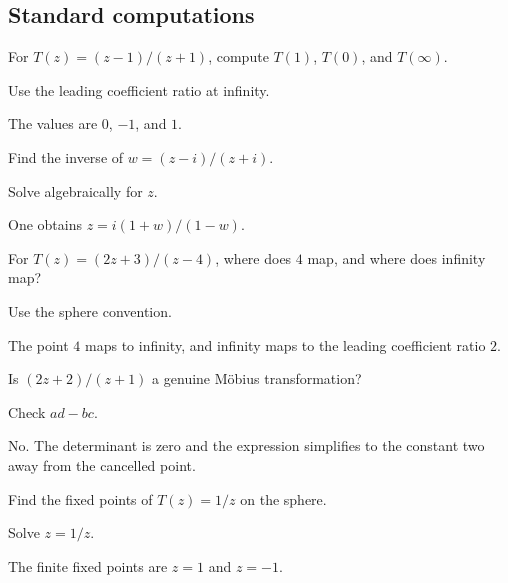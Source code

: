 \subsection*{Standard computations}

\begin{exercise}\label{exr:iv16-expand-01}
For \(T(z)=(z-1)/(z+1)\), compute \(T(1)\), \(T(0)\), and \(T(\infty)\).
\end{exercise}
\begin{hint}
Use the leading coefficient ratio at infinity.
\end{hint}
\begin{solution}
The values are \(0\), \(-1\), and \(1\).
\end{solution}

\begin{exercise}\label{exr:iv16-expand-02}
Find the inverse of \(w=(z-i)/(z+i)\).
\end{exercise}
\begin{hint}
Solve algebraically for \(z\).
\end{hint}
\begin{solution}
One obtains \(z=i(1+w)/(1-w)\).
\end{solution}

\begin{exercise}\label{exr:iv16-expand-03}
For \(T(z)=(2z+3)/(z-4)\), where does \(4\) map, and where does infinity map?
\end{exercise}
\begin{hint}
Use the sphere convention.
\end{hint}
\begin{solution}
The point \(4\) maps to infinity, and infinity maps to the leading coefficient ratio \(2\).
\end{solution}

\begin{exercise}[Determinant]\label{exr:iv16-expand-04}
Is \((2z+2)/(z+1)\) a genuine Möbius transformation?
\end{exercise}
\begin{hint}
Check \(ad-bc\).
\end{hint}
\begin{solution}
No. The determinant is zero and the expression simplifies to the constant two away from the cancelled point.
\end{solution}

\begin{exercise}\label{exr:iv16-expand-05}
Find the fixed points of \(T(z)=1/z\) on the sphere.
\end{exercise}
\begin{hint}
Solve \(z=1/z\).
\end{hint}
\begin{solution}
The finite fixed points are \(z=1\) and \(z=-1\).
\end{solution}

